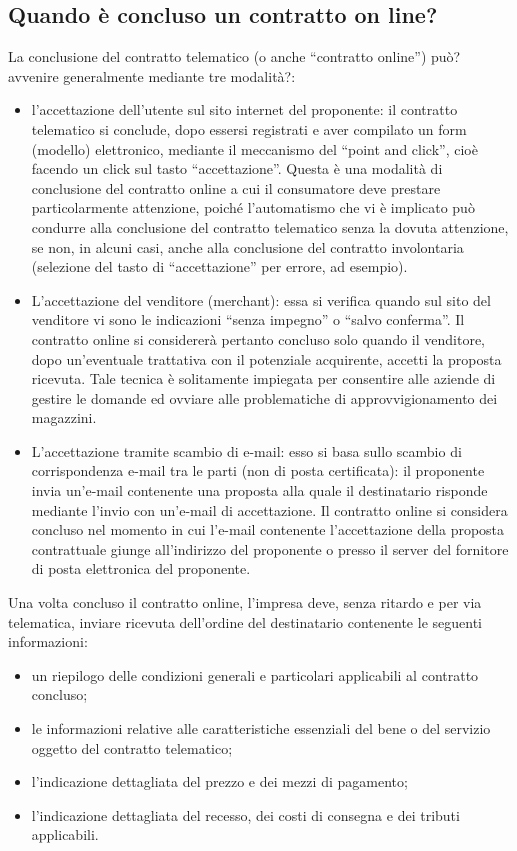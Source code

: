 \subsection{Quando è concluso un contratto on line?}
La conclusione del contratto telematico (o anche “contratto online”) può? avvenire generalmente mediante tre modalità?:
\begin{itemize}
    \item l’accettazione dell’utente sul sito internet del proponente: il contratto
        telematico si conclude, dopo essersi registrati e aver compilato un form (modello)
        elettronico, mediante il meccanismo del “point and click”, cioè facendo un click
        sul tasto “accettazione”. Questa è una modalità di conclusione del contratto
        online a cui il consumatore deve prestare particolarmente attenzione, poiché
        l’automatismo che vi è implicato può condurre alla conclusione del contratto
        telematico senza la dovuta attenzione, se non, in alcuni casi, anche alla
        conclusione del contratto involontaria (selezione del tasto di “accettazione” per
        errore, ad esempio).
    \item L’accettazione del venditore (merchant):  essa si verifica quando sul sito del
        venditore vi sono le indicazioni “senza impegno” o “salvo conferma”. Il contratto
        online si considererà pertanto concluso solo quando il venditore, dopo
        un’eventuale trattativa con il potenziale acquirente, accetti la proposta
        ricevuta. Tale tecnica è solitamente impiegata per consentire alle aziende di
        gestire le domande ed ovviare alle problematiche di approvvigionamento dei
        magazzini.
    \item L’accettazione tramite scambio di e-mail: esso si basa sullo scambio di
        corrispondenza e-mail tra le parti (non di posta certificata): il proponente invia
        un’e-mail contenente una proposta alla quale il destinatario risponde mediante
        l’invio con un’e-mail di accettazione. Il contratto online si considera concluso
        nel momento in cui l’e-mail contenente l’accettazione della proposta contrattuale
        giunge all’indirizzo del proponente o presso il server del fornitore di posta
        elettronica del proponente.
\end{itemize}
Una volta concluso il contratto online, l’impresa deve, senza ritardo e per via
telematica, inviare ricevuta dell'ordine del destinatario contenente le seguenti
informazioni:
\begin{itemize}
    \item un riepilogo delle condizioni generali e particolari applicabili al contratto concluso;
    \item le informazioni relative alle caratteristiche essenziali del bene o del servizio oggetto del contratto telematico;
    \item l'indicazione dettagliata del prezzo e dei mezzi di pagamento;
    \item l'indicazione dettagliata del recesso, dei costi di consegna e dei tributi applicabili.
\end{itemize}
